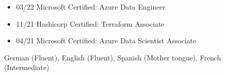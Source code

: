 \documentclass[a4paper, 12]{scrartcl}
\newcommand{\preSectionSpace}{\vspace{4pt}}
\newcommand{\afterSectionSpace}{\vspace{3pt}}
\newcommand{\horizontalSpaceBeforeSection}{\hspace{0.1cm}}
\newcommand{\fromBis}[2]{\scriptsize{#1 - #2}}
\newcommand{\cvSection}[1]{\preSectionSpace{\large\textcolor{black}{#1}}\afterSectionSpace}
\newcommand{\composedCvSection}[1]{\preSectionSpace{\large\textcolor{black}{#1}}}
\newcommand{\cvDate}[1]{\scriptsize{#1}}
\newcommand{\cvSkill}[1]{\footnotesize{#1}}
\newcommand\VRule{\color{lightGray}\vrule width 0.25pt}
\begin{document}
            \parbox{1.0\linewidth}{
                \composedCvSection{Certifications}
                
                \parbox{0.45\linewidth}{
                    \begin{flushleft}
                        \begin{itemize}[label={}]
                            \item 03/22 Microsoft Certified: Azure Data Engineer
                            \item 11/21 Hashicorp Certified: Terraform Associate
                            \item 04/21 Microsoft Certified: Azure Data Scientist Associate
                        \end{itemize}	
                    \end{flushleft}
	       }
            }
    
	\cvSection{Languages}
 
	\begin{minipage}{1.0\textwidth}
		\begin{flushleft}
			\cvSkill{German} (Fluent), \cvSkill{English} (Fluent), \cvSkill{Spanish} (Mother tongue), \cvSkill{French} (Intermediate)
		\end{flushleft}
	\end{minipage}

	
	
	
	
	
	
\end{document}

